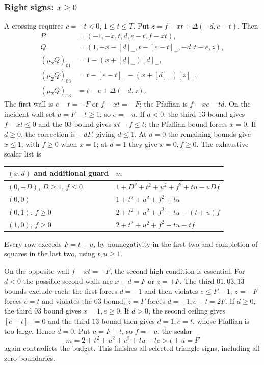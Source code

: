 \subsubsection{Right signs: $x\ge0$}
A crossing requires $c=-t<0$, $1\le t\le T$. Put $z=f-xt+\Delta(-d,e-t)$. Then
\begin{align*}
 P&=(-1,-x,t,d,e-t,f-xt),\\
 Q&=(1,-x-[d]_-,t-[e-t]_-,-d,t-e,z),\\
 (\mu_2Q)_{01}&=1-(x+[d]_-)[d]_-,\\
 (\mu_2Q)_{03}&=t-[e-t]_--(x+[d]_-)[z]_-,\\
 (\mu_2Q)_{13}&=t-e+\Delta(-d,z).
\end{align*}
The first wall is $e-t=-F$ or $f-xt=-F$; the Pfaffian is $f-xe-td$.
On the incident wall set $u=F-t\ge1$, so $e=-u$. If $d<0$, the third $13$ bound gives $f-xt\le0$ and the $03$ bound gives $xt-f\le t$; the Pfaffian bound forces $x=0$. If $d\ge0$, the correction is $-dF$, giving $d\le1$. At $d=0$ the remaining bounds give $x\le1$, with $f\ge0$ when $x=1$; at $d=1$ they give $x=0,f\ge0$. The exhaustive scalar list is
\begin{center}\begin{tabular}{ll}\toprule
$(x,d)$ and additional guard & $m$\\\midrule
$(0,-D)$, $D\ge1$, $f\le0$ & $1+D^2+t^2+u^2+f^2+tu-uDf$\\
$(0,0)$ & $1+t^2+u^2+f^2+tu$\\
$(0,1)$, $f\ge0$ & $2+t^2+u^2+f^2+tu-(t+u)f$\\
$(1,0)$, $f\ge0$ & $2+t^2+u^2+f^2+tu-tf$\\\bottomrule
\end{tabular}\end{center}
Every row exceeds $F=t+u$, by nonnegativity in the first two and completion of squares in the last two, using $t,u\ge1$.

On the opposite wall $f-xt=-F$, the second-high condition is essential. For $d<0$ the possible second walls are $x-d=F$ or $z=\pm F$. The third $01,03,13$ bounds exclude each: the first forces $d=-1$ and then violates $e\le F-1$; $z=-F$ forces $e=t$ and violates the $03$ bound; $z=F$ forces $d=-1,e-t=2F$. If $d\ge0$, the third $03$ bound gives $x=1,e\ge0$. If $d>0$, the second ceiling gives $[e-t]_-=0$ and the third $13$ bound then gives $d=1,e=t$, whose Pfaffian is too large. Hence $d=0$. Put $u=F-t$, so $f=-u$; the scalar
\[
 m=2+t^2+u^2+e^2+tu-te>t+u=F
\]
again contradicts the budget. This finishes all selected-triangle signs, including all zero boundaries.

